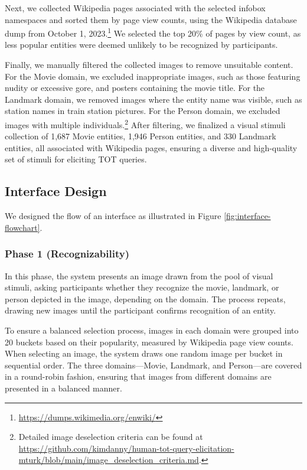 Next, we collected Wikipedia pages associated with the selected infobox namespaces and sorted them by page view counts, using the Wikipedia database dump from October 1, 2023.\footnote{\url{https://dumps.wikimedia.org/enwiki/}} We selected the top 20\% of pages by view count, as less popular entities were deemed unlikely to be recognized by participants.

Finally, we manually filtered the collected images to remove unsuitable content. For the Movie domain, we excluded inappropriate images, such as those featuring nudity or excessive gore, and posters containing the movie title. For the Landmark domain, we removed images where the entity name was visible, such as station names in train station pictures. For the Person domain, we excluded images with multiple individuals.\footnote{Detailed image deselection criteria can be found at \url{https://github.com/kimdanny/human-tot-query-elicitation-mturk/blob/main/image_deselection_criteria.md}.} After filtering, we finalized a visual stimuli collection of 1,687 Movie entities, 1,946 Person entities, and 330 Landmark entities, all associated with Wikipedia pages, ensuring a diverse and high-quality set of stimuli for eliciting TOT queries.






\subsection{Interface Design}


We designed the flow of an interface as illustrated in Figure \ref{fig:interface-flowchart}.

\subsubsection{\textbf{Phase 1 (Recognizability)}}
In this phase, the system presents an image drawn from the pool of visual stimuli, asking participants whether they recognize the movie, landmark, or person depicted in the image, depending on the domain. The process repeats, drawing new images until the participant confirms recognition of an entity.

To ensure a balanced selection process, images in each domain were grouped into 20 buckets based on their popularity, measured by Wikipedia page view counts. When selecting an image, the system draws one random image per bucket in sequential order. The three domains---Movie, Landmark, and Person---are covered in a round-robin fashion, ensuring that images from different domains are presented in a balanced manner.


